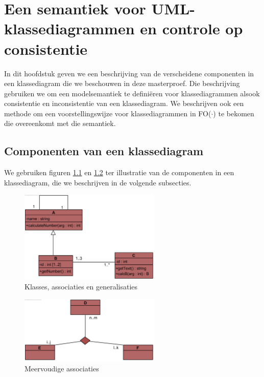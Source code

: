 \chapter{Een semantiek voor UML-klassediagrammen en controle op consistentie}\label{sec:consistentie}
In dit hoofdstuk geven we een beschrijving van de verscheidene componenten in een klassediagram die we beschouwen in deze masterproef. Die beschrijving gebruiken we om een modelsemantiek te defini\"eren voor klassediagrammen alsook consistentie en inconsistentie van een klassediagram. We beschrijven ook een methode om een voorstellingswijze voor klassediagrammen in FO($\cdot$) te bekomen die overeenkomt met die semantiek.

\section{Componenten van een klassediagram}\label{sec:cd-components}

We gebruiken figuren \ref{fig:voorbeeld1} en \ref{fig:voorbeeld2} ter illustratie van de componenten in een klassediagram, die we beschrijven in de volgende subsecties.

\begin{figure}[h]
	\centering
	\includegraphics[width=0.6\textwidth]{chap-consistentie/voorbeeld1.png}
	\caption{Klasses, associaties en generalisaties}
	\label{fig:voorbeeld1}
\end{figure}

\begin{figure}[h]
	\centering
	\includegraphics[width=0.6\textwidth]{chap-consistentie/voorbeeld2.png}
	\caption{Meervoudige associaties}
	\label{fig:voorbeeld2}
\end{figure}

